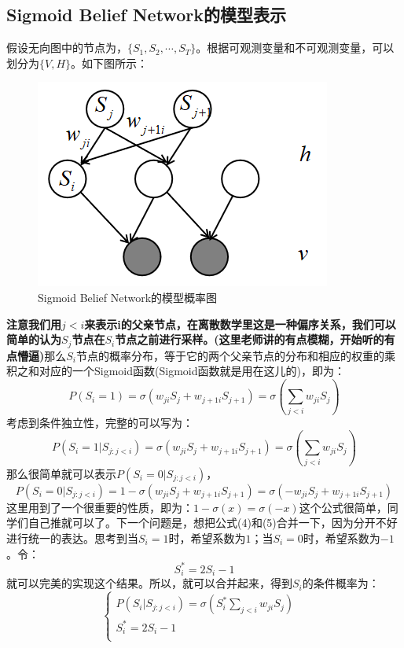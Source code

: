 \documentclass[a4paper]{article}
\begin{document}
\subsection{Sigmoid Belief Network的模型表示}
假设无向图中的节点为，$\{ S_1,S_2,\cdots,S_T \}$。根据可观测变量和不可观测变量，可以划分为$\{V,H\}$。如下图所示：
\begin{figure}[H]
    \centering
    \includegraphics[width=.35\textwidth]{微信图片_20200317124813.png}
    \caption{Sigmoid Belief Network的模型概率图}
    \label{fig:my_label_1}
\end{figure}
\textbf{注意我们用$j<i$来表示i的父亲节点，在离散数学里这是一种偏序关系，我们可以简单的认为$S_j$节点在$S_i$节点之前进行采样。(这里老师讲的有点模糊，开始听的有点懵逼)}那么$S_i$节点的概率分布，等于它的两个父亲节点的分布和相应的权重的乘积之和对应的一个Sigmoid函数(Sigmoid函数就是用在这儿的)，即为：
$$
P(S_i=1) = \sigma(w_{ji}S_j + w_{j+1i}S_{j+1}) = \sigma(\sum_{j<i}w_{ji}S_j )
$$
考虑到条件独立性，完整的可以写为：
\begin{equation}
    P(S_i=1|S_{j:j<i}) = \sigma\left(w_{ji}S_j + w_{j+1i}S_{j+1}\right) = \sigma\left(\sum_{j<i}w_{ji}S_j \right)
\end{equation}
那么很简单就可以表示$P(S_i=0|S_{j:j<i})$，
\begin{equation}
    P(S_i=0|S_{j:j<i}) = 1 - \sigma\left(w_{ji}S_j + w_{j+1i}S_{j+1}\right) = \sigma\left(-w_{ji}S_j + w_{j+1i}S_{j+1}\right)
\end{equation}
这里用到了一个很重要的性质，即为：$1 - \sigma(x)=\sigma(-x)$这个公式很简单，同学们自己推就可以了。下一个问题是，想把公式(4)和(5)合并一下，因为分开不好进行统一的表达。思考到当$S_i=1$时，希望系数为$1$；当$S_i=0$时，希望系数为$-1$。令：
\begin{equation}
    S^\ast_i = 2S_i -1
\end{equation}
就可以完美的实现这个结果。所以，就可以合并起来，得到$S_i$的条件概率为：
\begin{equation}
    \left\{
    \begin{array}{ll}
      P(S_i|S_{j:j<i}) = \sigma\left(S^\ast_i\sum_{j<i}w_{ji}S_j \right)& \\
      S^\ast_i = 2S_i -1 & \\
    \end{array}
    \right.
\end{equation}
\end{document}
